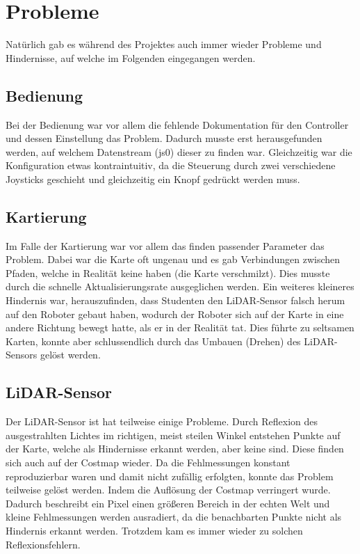 
\section{Probleme}
{
	Natürlich gab es während des Projektes auch immer wieder Probleme und Hindernisse, auf welche im Folgenden eingegangen werden.
	\subsection{Bedienung}
	{
		Bei der Bedienung war vor allem die fehlende Dokumentation für den Controller und dessen Einstellung das Problem. Dadurch musste erst herausgefunden werden, auf welchem Datenstream (js0) dieser zu finden war. Gleichzeitig war die Konfiguration etwas kontraintuitiv, da die Steuerung durch zwei verschiedene Joysticks geschieht und gleichzeitig ein Knopf gedrückt werden muss.
	}

	\subsection{Kartierung}
	{
		Im Falle der Kartierung war vor allem das finden passender Parameter das Problem. Dabei war die Karte oft ungenau und es gab Verbindungen zwischen Pfaden, welche in Realität keine haben (die Karte verschmilzt). Dies musste durch die schnelle Aktualisierungsrate ausgeglichen werden.
		Ein weiteres kleineres Hindernis war, herauszufinden, dass Studenten den LiDAR-Sensor falsch herum auf den Roboter gebaut haben, wodurch der Roboter sich auf der Karte in eine andere Richtung bewegt hatte, als er in der Realität tat. Dies führte zu seltsamen Karten, konnte aber schlussendlich durch das Umbauen (Drehen) des LiDAR-Sensors gelöst werden.
	}
	
	\subsection{LiDAR-Sensor}
	{
		Der LiDAR-Sensor ist hat teilweise einige Probleme. Durch Reflexion des ausgestrahlten Lichtes im richtigen, meist steilen Winkel entstehen Punkte auf der Karte, welche als Hindernisse erkannt werden, aber keine sind. Diese finden sich auch auf der Costmap wieder. Da die Fehlmessungen konstant reproduzierbar waren und damit nicht zufällig erfolgten, konnte das Problem teilweise gelöst werden. Indem die Auflösung der Costmap verringert wurde. Dadurch beschreibt ein  Pixel einen größeren Bereich in der echten Welt und kleine Fehlmessungen werden ausradiert, da die benachbarten Punkte nicht als Hindernis erkannt werden. Trotzdem kam es immer wieder zu solchen Reflexionsfehlern.
	}

}
\newpage
